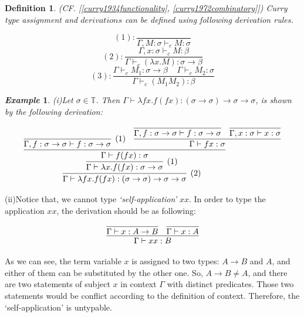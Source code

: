 \documentclass[a4paper,11pt,twoside]{report}
\newtheorem{def1}{\textbf{Definition}}[chapter]
\newtheorem{exmp}{\textit{Example}}[section]
\begin{document}
\begin{def1}
\normalfont (CF. [\ref{curry1934functionality}, \ref{curry1972combinatory}]) Curry type assignment and $derivations$ can be defined using following derivation rules.  
\end{def1}

\begin{equation*}
(1):\frac{}{\Gamma ,M:\sigma \vdash _cM:\sigma} 
\end{equation*}
\begin{equation*}
(2):\frac{\Gamma ,x:\sigma \vdash _cM:\beta}{\Gamma \vdash _c(\lambda x.M):\sigma \rightarrow \beta} 
\end{equation*}
\begin{equation*}
(3):\frac{\Gamma \vdash _cM_1:\sigma \rightarrow \beta\ \ \ \ \ \Gamma \vdash _cM_2:\sigma}{\Gamma \vdash _c(M_1M_2):\beta} 
\end{equation*}

\begin{exmp}
\normalfont (i)Let $\sigma \in \mathbb{T}$. Then $\Gamma \vdash \lambda fx.f(fx):(\sigma \rightarrow \sigma)\rightarrow \sigma \rightarrow \sigma$, is shown by the following derivation:
\end{exmp}

$$
\infer[(2)]{\Gamma \vdash \lambda fx.f(fx):(\sigma \rightarrow \sigma)\rightarrow \sigma \rightarrow \sigma}{
	\infer[(1)]{\Gamma \vdash \lambda x.f(fx):\sigma \rightarrow \sigma}{
      \infer{\Gamma \vdash f(fx):\sigma}{
             \infer[(1)]{\Gamma,f:\sigma \rightarrow \sigma \vdash f:\sigma \rightarrow \sigma}{}
             & 
             \infer{\Gamma \vdash fx:\sigma}{
                \infer{\Gamma,f:\sigma \rightarrow \sigma \vdash f:\sigma \rightarrow \sigma}{}
                &
                \infer{\Gamma,x:\sigma \vdash x:\sigma}{}
             }
         }
      }		
	}
$$


(ii)Notice that, we cannot type \textit{`self-application'} $xx$. In order to type the application $xx$, the derivation should be as following:

$$
\infer{\Gamma \vdash xx:B}{
    \infer{\Gamma \vdash x:A \rightarrow B}{} 
    &
    \infer{\Gamma \vdash x:A}{}
}
$$


As we can see, the term variable $x$ is assigned to two types: $A \rightarrow B$ and $A$, and either of them can be substituted by the other one. So, $A \rightarrow B \neq A$, and there are two statements of subject $x$ in context $\Gamma$ with distinct predicates. Those two statements would be conflict according to the definition of context. Therefore, the `self-application' is untypable. 
\end{document}
